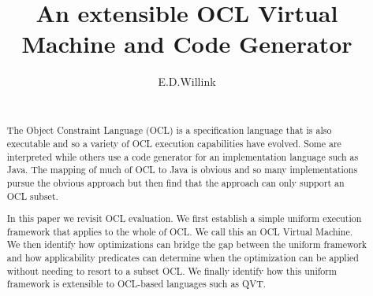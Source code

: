 \documentclass{acm_proc_article-sp}
\begin{document}
\title{An extensible OCL Virtual Machine and Code Generator}

%
%
%
%
%

\author{
%
%
\alignauthor
E.D.Willink\\
       \\
}

\maketitle
\begin{abstract}
The Object Constraint Language (OCL) is a specification language that is also executable
and so a variety of OCL execution capabilities have evolved. Some are interpreted while
others use a code generator for an implementation language such as Java. The mapping
of much of OCL to Java is obvious and so many implementations pursue the obvious approach
but then find that the approach can only support an OCL subset.

In this paper we revisit OCL evaluation. We first establish a simple uniform execution framework
that applies to the whole of OCL. We call this an OCL Virtual Machine.
We then identify how optimizations can bridge the gap between
the uniform framework and how applicability predicates can determine when the optimization can
be applied without needing to resort to a subset OCL. We finally identify how this uniform
framework is extensible to OCL-based languages such as QVT.
\end{abstract}
\end{document}
